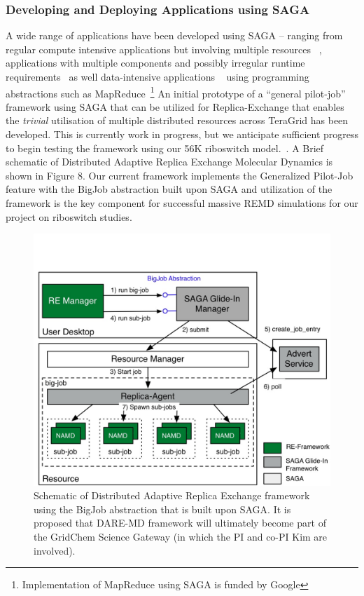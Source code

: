 \documentclass[a4paper,10pt]{article}
\begin{document}
\subsubsection*{Developing and Deploying Applications using SAGA}

A wide range of applications have been developed using SAGA -- ranging from regular compute intensive applications but involving multiple resources ~\cite{saga_escience07, gmac, REMD-PhilTranA2009}, applications with multiple components and possibly irregular runtime requirements~\cite{saga_loosely_coupled, teragrid08} as well data-intensive applications ~\cite{saga_data_intensive, saga_grid_cloud} using programming abstractions such as MapReduce~\footnote{Implementation of MapReduce using SAGA is funded by Google} An initial prototype of a ``general pilot-job'' framework using SAGA that can be utilized for Replica-Exchange that enables the {\it trivial} utilisation of multiple distributed resources across TeraGrid has been developed. This is currently work in progress, but we anticipate sufficient progress to begin testing the framework using our 56K riboswitch model.~\cite{REMD-PhilTranA2009}. A Brief schematic of Distributed Adaptive Replica Exchange Molecular Dynamics is shown in Figure 8.  Our current framework implements the Generalized Pilot-Job feature with the BigJob abstraction built upon SAGA and utilization of the framework is the key component for successful massive REMD simulations for our project on riboswitch studies.

\begin{figure} \begin{center} \includegraphics[scale=0.55]{DARE-MD} \end{center} \caption{Schematic of Distributed Adaptive Replica Exchange framework using the BigJob abstraction that is built upon SAGA. It is proposed that DARE-MD framework will ultimately become part of the GridChem Science Gateway (in which the PI and co-PI Kim are involved).} \label{fig:results} \end{figure}
\end{document}
